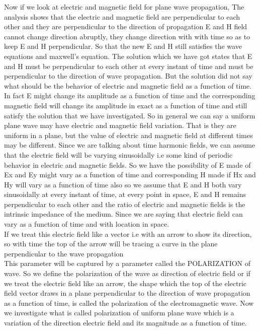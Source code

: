 Now if we look  at electric and magnetic field for plane wave propagation, The analysis shows that the electric and magnetic field are perpendicular to each other and they are perpendicular  to the direction of propagation E and H field cannot  change direction abruptly, they change direction with with time so as to keep E and H perpendicular. So that the new E and H still satisfies the wave equations and maxwell's equation. The solution which we have got states that E and H must be perpendicular to each other at every instant of time and must be perpendicular to the direction of wave propagation. But the solution did not say what should be the behavior of electric and magnetic field as a function of time. In fact E might change its amplitude as a function of time and the corresponding magnetic field will change its amplitude in exact as a function of time and still satisfy the solution that we have investigated. So in general we can say a uniform plane wave may have electric and magnetic field variation. That is they are uniform in a plane, but the value of electric and magnetic field at different times may be different. Since we are talking about time harmonic fields, we can assume that the electric field will be varying sinusoidally i.e some kind of periodic behavior in electric and magnetic fields. So we have the possibility of E made of Ex and Ey might vary as a function of time and corresponding H made if Hx and Hy will vary as a function of time also so we assume that E and H both vary sinusoidally at every instant of time, at every point in space, E and H remains perpendicular to each other and the ratio of electric and magnetic fields is the intrinsic impedance of the medium. Since we are saying that electric field can vary as a function of time and with location in space.
\\

If we treat this electric field like a vector i.e with an arrow to show its direction, so with time the top of the arrow will be tracing a curve in the plane perpendicular to the wave propagation\\

This parameter will be captured by a parameter called the POLARIZATION of  wave. So we define the polarization of the wave as  direction of  electric field or if we treat the electric field like an arrow, the shape which the top of the electric field vector draws in a plane perpendicular to the direction of wave propagation as a function of time, is called the polarization of the electromagnetic wave. Now we investigate what is called polarization of uniform plane wave which is a variation of the direction electric field and its magnitude as a function of time.\\

